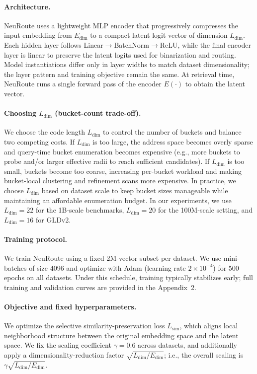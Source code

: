 \documentclass[sigconf, nonacm]{acmart}
\begin{document}
\paragraph{Architecture.}
NeuRoute uses a lightweight MLP encoder that progressively compresses the input embedding from $E_{\text{dim}}$ to a compact latent logit vector of dimension $L_{\text{dim}}$. Each hidden layer follows Linear$\rightarrow$BatchNorm$\rightarrow$ReLU, while the final encoder layer is linear to preserve the latent logits used for binarization and routing. Model instantiations differ only in layer widths to match dataset dimensionality; the layer pattern and training objective remain the same. At retrieval time, NeuRoute runs a single forward pass of the encoder $E(\cdot)$ to obtain the latent vector.

\paragraph{Choosing $L_{\text{dim}}$ (bucket-count trade-off).}
We choose the code length $L_{\text{dim}}$ to control the number of buckets and balance two competing costs. If $L_{\text{dim}}$ is too large, the address space becomes overly sparse and query-time bucket enumeration becomes expensive (e.g., more buckets to probe and/or larger effective radii to reach sufficient candidates). If $L_{\text{dim}}$ is too small, buckets become too coarse, increasing per-bucket workload and making bucket-local clustering and refinement scans more expensive. In practice, we choose $L_{\text{dim}}$ based on dataset scale to keep bucket sizes manageable while maintaining an affordable enumeration budget. In our experiments, we use $L_{\text{dim}}{=}22$ for the 1B-scale benchmarks, $L_{\text{dim}}{=}20$ for the 100M-scale setting, and $L_{\text{dim}}{=}16$ for GLDv2.

\paragraph{Training protocol.}
We train NeuRoute using a fixed 2M-vector subset per dataset. We use mini-batches of size 4096 and optimize with Adam (learning rate $2\times 10^{-4}$) for 500 epochs on all datasets. Under this schedule, training typically stabilizes early; full training and validation curves are provided in the Appendix~2.

\paragraph{Objective and fixed hyperparameters.}
We optimize the selective similarity-preservation loss $L_{\text{sim}}$, which aligns local neighborhood structure between the original embedding space and the latent space. We fix the scaling coefficient $\gamma=0.6$ across datasets, and additionally apply a dimensionality-reduction factor $\sqrt{L_{\mathrm{dim}}/E_{\mathrm{dim}}}$; i.e., the overall scaling is $\gamma \sqrt{L_{\mathrm{dim}}/E_{\mathrm{dim}}}$.
\end{document}
